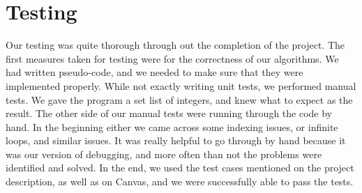 \documentclass[11pt,letterpaper]{article}
\begin{document}
\section{Testing}
\hspace{25pt}Our testing was quite thorough through out the completion of the project. The first measures taken for testing were for the correctness of our algorithms. We had written pseudo-code, and we needed to make sure that they were implemented properly. While not exactly writing unit tests, we performed manual tests. We gave the program a set list of integers, and knew what to expect as the result. The other side of our manual tests were running through the code by hand. In the beginning either we came across some indexing issues, or infinite loops, and similar issues. It was really helpful to go through by hand because it was our version of debugging, and more often than not the problems were identified and solved. In the end, we used the test cases mentioned on the project description, as well as on Canvas, and we were successfully able to pass the tests.\vspace{8pt}
\end{document}
